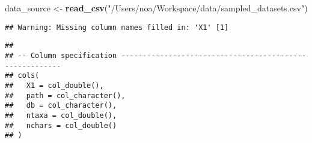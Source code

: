 \documentclass[
]{article}
\newenvironment{Shaded}{\begin{snugshade}}{\end{snugshade}}
\newcommand{\ControlFlowTok}[1]{\textcolor[rgb]{0.13,0.29,0.53}{\textbf{#1}}}
\newcommand{\DataTypeTok}[1]{\textcolor[rgb]{0.13,0.29,0.53}{#1}}
\newcommand{\KeywordTok}[1]{\textcolor[rgb]{0.13,0.29,0.53}{\textbf{#1}}}
\newcommand{\NormalTok}[1]{#1}
\newcommand{\OperatorTok}[1]{\textcolor[rgb]{0.81,0.36,0.00}{\textbf{#1}}}
\newcommand{\OtherTok}[1]{\textcolor[rgb]{0.56,0.35,0.01}{#1}}
\newcommand{\StringTok}[1]{\textcolor[rgb]{0.31,0.60,0.02}{#1}}
\begin{document}
\begin{Shaded}
\begin{Highlighting}[]
\NormalTok{data_source <-}\StringTok{ }\KeywordTok{read_csv}\NormalTok{(}\StringTok{"/Users/noa/Workspace/data/sampled_datasets.csv"}\NormalTok{)}
\end{Highlighting}
\end{Shaded}

\begin{verbatim}
## Warning: Missing column names filled in: 'X1' [1]
\end{verbatim}

\begin{verbatim}
## 
## -- Column specification --------------------------------------------------------
## cols(
##   X1 = col_double(),
##   path = col_character(),
##   db = col_character(),
##   ntaxa = col_double(),
##   nchars = col_double()
## )
\end{verbatim}

\begin{Shaded}
\end{Shaded}
\end{document}
